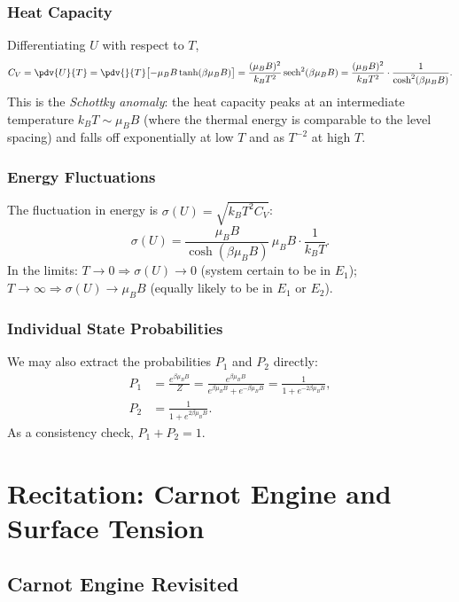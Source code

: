 \subsection{Heat Capacity}

Differentiating $U$ with respect to $T$,
\begin{equation}
    C_V = \pdv{U}{T} = \pdv{}{T}\bigl[-\mu_B B\tanh(\beta\mu_B B)\bigr]
        = \frac{(\mu_B B)^2}{k_B T^2}\,\mathrm{sech}^2(\beta\mu_B B)
        = \frac{(\mu_B B)^2}{k_BT^2}\cdot\frac{1}{\cosh^2(\beta\mu_B B)}.
\end{equation}
This is the \emph{Schottky anomaly}: the heat capacity peaks at an intermediate temperature
$k_BT \sim \mu_B B$ (where the thermal energy is comparable to the level spacing) and falls
off exponentially at low $T$ and as $T^{-2}$ at high $T$.

\subsection{Energy Fluctuations}

The fluctuation in energy is $\sigma(U) = \sqrt{k_BT^2 C_V}$:
\begin{equation}
    \sigma(U) = \frac{\mu_B B}{\cosh(\beta\mu_B B)}\,\mu_B B \cdot \frac{1}{k_BT}.
\end{equation}
In the limits: $T\to 0 \Rightarrow \sigma(U)\to 0$ (system certain to be in $E_1$); $T\to\infty
\Rightarrow \sigma(U)\to\mu_B B$ (equally likely to be in $E_1$ or $E_2$).

\subsection{Individual State Probabilities}

We may also extract the probabilities $P_1$ and $P_2$ directly:
\begin{align}
    P_1 &= \frac{e^{\beta\mu_B B}}{Z} = \frac{e^{\beta\mu_B B}}{e^{\beta\mu_B B}+e^{-\beta\mu_B B}}
          = \frac{1}{1+e^{-2\beta\mu_B B}}, \\[4pt]
    P_2 &= \frac{1}{1+e^{2\beta\mu_B B}}.
\end{align}
As a consistency check, $P_1 + P_2 = 1$.

\chapter{Recitation: Carnot Engine and Surface Tension}

\section{Carnot Engine Revisited}

